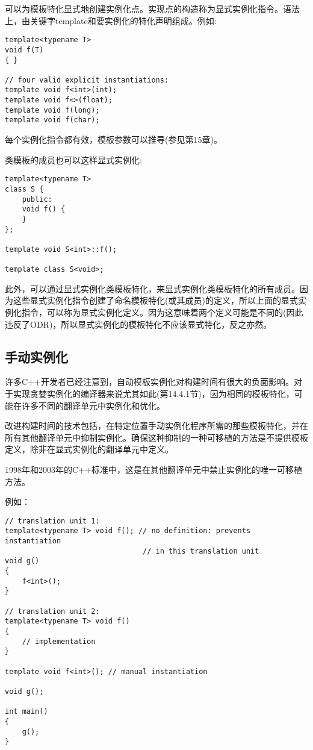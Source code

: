 
可以为模板特化显式地创建实例化点。实现点的构造称为显式实例化指令。语法上，由关键字template和要实例化的特化声明组成。例如:

\begin{lstlisting}[style=styleCXX]
template<typename T>
void f(T)
{ }

// four valid explicit instantiations:
template void f<int>(int);
template void f<>(float);
template void f(long);
template void f(char);
\end{lstlisting}

每个实例化指令都有效，模板参数可以推导(参见第15章)。

类模板的成员也可以这样显式实例化:

\begin{lstlisting}[style=styleCXX]
template<typename T>
class S {
	public:
	void f() {
	}
};

template void S<int>::f();

template class S<void>;
\end{lstlisting}

此外，可以通过显式实例化类模板特化，来显式实例化类模板特化的所有成员。因为这些显式实例化指令创建了命名模板特化(或其成员)的定义，所以上面的显式实例化指令，可以称为显式实例化定义。因为这意味着两个定义可能是不同的(因此违反了ODR)，所以显式实例化的模板特化不应该显式特化，反之亦然。

\subsection{手动实例化}

许多C++开发者已经注意到，自动模板实例化对构建时间有很大的负面影响。对于实现贪婪实例化的编译器来说尤其如此(第14.4.1节)，因为相同的模板特化，可能在许多不同的翻译单元中实例化和优化。

改进构建时间的技术包括，在特定位置手动实例化程序所需的那些模板特化，并在所有其他翻译单元中抑制实例化。确保这种抑制的一种可移植的方法是不提供模板定义，除非在显式实例化的翻译单元中定义。

\begin{tcolorbox}[colback=webgreen!5!white,colframe=webgreen!75!black]
\hspace*{0.75cm}1998年和2003年的C++标准中，这是在其他翻译单元中禁止实例化的唯一可移植方法。
\end{tcolorbox}

例如：

\begin{lstlisting}[style=styleCXX]
// translation unit 1:
template<typename T> void f(); // no definition: prevents instantiation
								// in this translation unit
void g()
{
	f<int>();
}

// translation unit 2:
template<typename T> void f()
{
	// implementation
}

template void f<int>(); // manual instantiation

void g();

int main()
{
	g();
}
\end{lstlisting}

